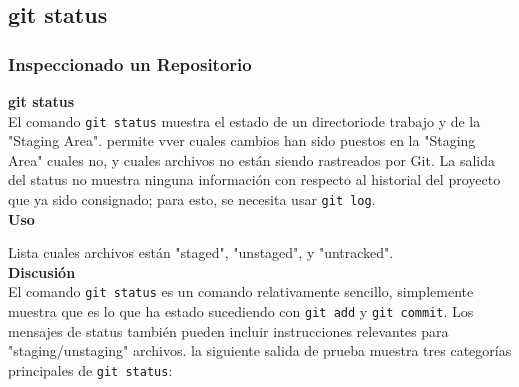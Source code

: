 \documentclass[8pt]{beamer}
\begin{document}
\subsection{git status}
\begin{frame}
\frametitle{Inspeccionado un Repositorio}
\textbf{git status}\\
\medskip
El comando \texttt{git status} muestra el estado de un directoriode trabajo y  de la "Staging Area". permite vver cuales cambios han sido puestos en la "Staging Area" cuales no, y cuales archivos no est\'an siendo rastreados por Git. La salida del status no muestra ninguna informaci\'on con respecto al historial del proyecto que ya sido consignado; para esto, se necesita usar \texttt{git log}.\\
\medskip
\textbf{Uso}\\
\medskip

Lista cuales archivos est\'an "staged", "unstaged", y "untracked".\\
\medskip
\textbf{Discusi\'on}\\
\medskip
El comando \texttt{git status} es un comando relativamente sencillo, simplemente muestra que es lo que ha estado sucediendo con \texttt{git add} y \texttt{git commit}. Los mensajes de status tambi\'en pueden incluir instrucciones relevantes para "staging/unstaging" archivos.  la siguiente salida de prueba muestra tres categor\'ias principales de \texttt{git status}:

\end{frame}
\end{document}
